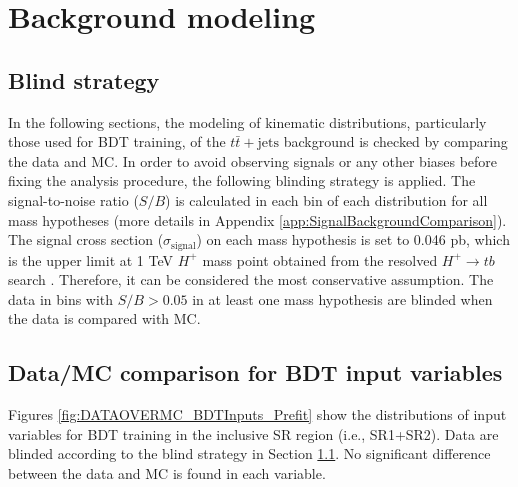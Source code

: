\section{Background modeling}
\label{sec:BkgModeling}

\subsection{Blind strategy}
\label{subsec:BlindStrategy}
In the following sections, the modeling of kinematic distributions, particularly those used for BDT training, of the $t\bar{t}+\text{jets}$ background is checked by comparing the data and MC. In order to avoid observing signals or any other biases before fixing the analysis procedure, the following blinding strategy is applied. The signal-to-noise ratio ($S/B$) is calculated in each bin of each distribution for all mass hypotheses (more details in Appendix \ref{app:SignalBackgroundComparison}). The signal cross section (${\sigma}_{\text{signal}}$) on each mass hypothesis is set to 0.046 pb, which is the upper limit at 1 TeV $H^{+}$ mass point obtained from the resolved $H^{+}{\rightarrow}tb$ search \cite{HDBS-2021-02}. Therefore, it can be considered the most conservative assumption. The data in bins with $S/B>0.05$ in at least one mass hypothesis are blinded when the data is compared with MC.

\subsection{Data/MC comparison for BDT input variables}
\label{subsec:Data/MCBDTInputBeforeReweight}
Figures \ref{fig:DATAOVERMC_BDTInputs_Prefit} show the distributions of input variables for BDT training in the inclusive SR region (i.e., SR1+SR2). Data are blinded according to the blind strategy in Section \ref{subsec:BlindStrategy}. No significant difference between the data and MC is found in each variable.

